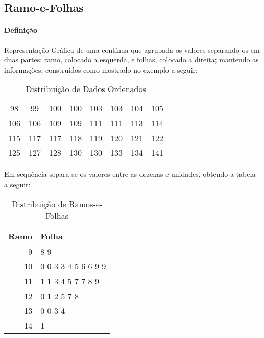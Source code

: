 \documentclass{article}
\begin{document}
        \subsection{Ramo-e-Folhas}
            \paragraph{Definição}Representação Gráfica de uma contínua que agrupada os valores separando-os em duas partes: ramo, colocado a esquerda, e folhas, colocado a direita; mantendo as informações, construídos como mostrado no exemplo a seguir:
                \begin{table}[H]
                    \centering
                    \begin{tabular}[]{cccccccc}\hline
                        98 &  99 & 100 & 100 & 103 & 103 & 104 & 105\\
                        106 & 106 & 109 & 109 & 111 & 111 & 113 & 114\\
                        115 & 117 & 117 & 118 & 119 & 120 & 121 & 122\\
                        125 & 127 & 128 & 130 & 130 & 133 & 134 & 141\\\hline
                    \end{tabular}
                    \caption{Distribuição de Dados Ordenados}\label{table:dataLeafs}
                \end{table} \noindent
            Em sequência separa-se os valores entre as dezenas e unidades, obtendo a tabela a seguir:
                \begin{table}[H]
                    \centering
                    \begin{tabular}[]{r|l}\hline
                        Ramo & Folha\\\hline
                         9   & 8 9\\
                        10   & 0 0 3 3 4 5 6 6 9 9\\
                        11   & 1 1 3 4 5 7 7 8 9\\
                        12   & 0 1 2 5 7 8\\
                        13   & 0 0 3 4\\
                        14   & 1\\\hline
                    \end{tabular}
                    \caption{Distribuição de Ramos-e-Folhas}\label{table:leafs}
                \end{table}
\end{document}
